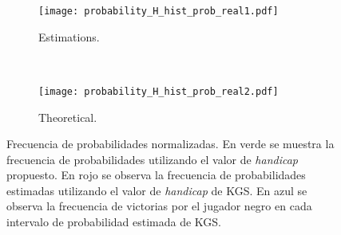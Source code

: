 \documentclass[11pt,twoside,spanish]{report} %
\begin{document}

\begin{figure}[H]
	\centering
	\begin{subfigure}[t]{.49\textwidth}
		\centering
		\texttt{[image: probability\_H\_hist\_prob\_real1.pdf]}
		\caption{Estimations.}
		\label{fig:prob_hist_a}
	\end{subfigure}
	~
	\begin{subfigure}[t]{.49\textwidth}
		\centering
		\texttt{[image: probability\_H\_hist\_prob\_real2.pdf]}
		\caption{Theoretical.}
		\label{fig:prob_hist_b}
	\end{subfigure}
	\caption{Frecuencia de probabilidades normalizadas. En verde se muestra la frecuencia de probabilidades utilizando el valor de \textit{handicap} propuesto. En rojo se observa la frecuencia de probabilidades estimadas utilizando el valor de \textit{handicap} de KGS.  En azul se observa la frecuencia de victorias por el jugador negro en cada intervalo de probabilidad estimada de KGS.}
	\label{fig:estimations_H_hist_prob_real}
\end{figure}
\end{document}
